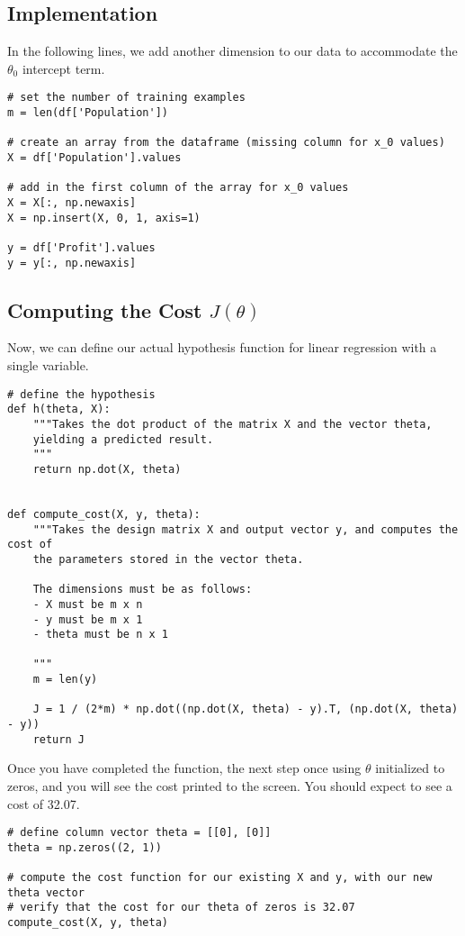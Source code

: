 \subsection*{Implementation}
In the following lines, we add another dimension to our data to accommodate the $\theta_0$ intercept term.

\begin{verbatim}
# set the number of training examples
m = len(df['Population'])

# create an array from the dataframe (missing column for x_0 values)
X = df['Population'].values

# add in the first column of the array for x_0 values
X = X[:, np.newaxis]
X = np.insert(X, 0, 1, axis=1)

y = df['Profit'].values
y = y[:, np.newaxis]
\end{verbatim}

\subsection*{Computing the Cost $J\left(\theta\right)$}
Now, we can define our actual hypothesis function for linear regression with a single variable. 
\begin{verbatim}
# define the hypothesis
def h(theta, X):
    """Takes the dot product of the matrix X and the vector theta,
    yielding a predicted result.
    """
    return np.dot(X, theta)


def compute_cost(X, y, theta):
    """Takes the design matrix X and output vector y, and computes the cost of
    the parameters stored in the vector theta.
    
    The dimensions must be as follows:
    - X must be m x n
    - y must be m x 1
    - theta must be n x 1
    
    """
    m = len(y)
    
    J = 1 / (2*m) * np.dot((np.dot(X, theta) - y).T, (np.dot(X, theta) - y))
    return J
\end{verbatim}


Once you have completed the function, the next step %
once using $\theta$  initialized to zeros, and you will see the cost printed to the screen. You should expect to see a cost of 32.07.

\begin{verbatim}
# define column vector theta = [[0], [0]]
theta = np.zeros((2, 1))

# compute the cost function for our existing X and y, with our new theta vector
# verify that the cost for our theta of zeros is 32.07
compute_cost(X, y, theta)
\end{verbatim}

